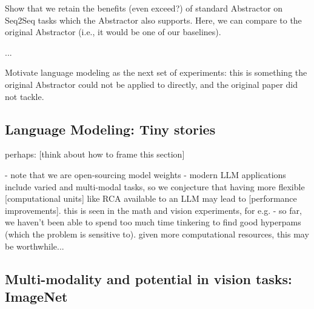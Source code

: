 Show that we retain the benefits (even exceed?) of standard Abstractor on Seq2Seq tasks which the Abstractor also supports. Here, we can compare to the original Abstractor (i.e., it would be one of our baselines).

...

Motivate language modeling as the next set of experiments: this is something the original Abstractor could not be applied to directly, and the original paper did not tackle.

\subsection{Language Modeling: Tiny stories}\label{ssec:tiny_stories}

perhaps: [think about how to frame this section] 

- note that we are open-sourcing model weights
- modern LLM applications include varied and multi-modal tasks, so we conjecture that having more flexible [computational units] like RCA available to an LLM may lead to [performance improvements]. this is seen in the math and vision experiments, for e.g.
- so far, we haven't been able to spend too much time tinkering to find good hyperpams (which the problem is sensitive to). given more computational resources, this may be worthwhile...


\subsection{Multi-modality and potential in vision tasks: ImageNet}\label{ssec:imagenett}
